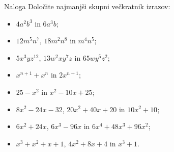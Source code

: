         \begin{frame}[t]
            \begin{exampleblock}{Naloga}
                Določite najmanjši skupni večkratnik izrazov:
                \begin{itemize}
                    \item<1-> $4a^2b^3$ in $6a^3b$;
                    \item<2-> $12m^5n^7$, $18m^2n^8$ in $m^4n^5$;
                    \item<3-> $5x^3yz^{12}$, $13w^2xy^7z$ in $65wy^5z^2$;
                    \item<4-> $x^{n+1}+x^n$ in $2x^{n+1}$;
                    \item<5-> $25-x^2$ in $x^2-10x+25$;
                    \item<6-> $8x^2-24x-32$, $20x^2+40x+20$ in $10x^2+10$;
                    \item<7-> $6x^2+24x$, $6x^3-96x$ in $6x^4+48x^3+96x^2$;
                    \item<8-> $x^3+x^2+x+1$, $4x^2+8x+4$ in $x^3+1$.
                \end{itemize}
            \end{exampleblock}
        \end{frame}

